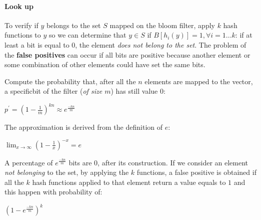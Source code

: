 \documentclass[10pt,a4paper]{report}
\begin{document}
\paragraph{Look up}\label{sec:look-up}
To verify if $y$ belongs to the set $S$ mapped on the bloom filter, apply $k$ hash functions to $y$ so we can determine that $y \in S$ if $B[h_{i}(y)]=1, \forall i = 1...k$: if at least a bit is equal to $0$, the element \textit{does not belong to the set}.
The problem of the \textbf{false positives} can occur if all bits are positive because another element or some combination of other elements could have set the same bits.

Compute the probability that, after all the $n$ elements are mapped to the vector, a specificbit of the filter (\textit{of size $m$}) has still value $0$:
\begin{center}
$p^{'} = (1 - \frac{1}{m})^{kn} \approx e^{\frac{-kn}{m}}$
\end{center}

The approximation is derived from the definition of $e$:
\begin{center}
$\lim_{x\to\infty} (1-\frac{1}{x})^{-x} = e$
\end{center}

A percentage of $e^{\frac{-kn}{m}}$ bits are $0$, after its construction. If we consider an element \textit{not belonging} to the set, by applying the $k$ functions, a false positive is obtained if all the $k$ hash functions applied to that element return a value equals to $1$ and this happen with probability of:
\begin{center}
	$(1 - e^{\frac{-kn}{m}})^{k}$
\end{center}
\end{document}
